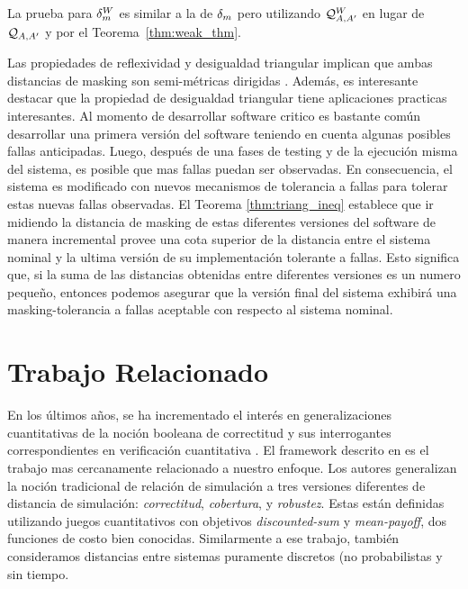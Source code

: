 La prueba para $\delta_{m}^W$ es similar a la de $\delta_{m}$ 
pero utilizando $\mathcal{Q}^W_{A,A'}$ en lugar de $\mathcal{Q}_{A, A'}$ y por el Teorema~\ref{thm:weak_thm}.

Las propiedades de reflexividad y desigualdad triangular implican que ambas distancias de masking son semi-métricas dirigidas \cite{CharikarMM06,AlfaroMRS08}. Además, es interesante destacar que la propiedad de desigualdad triangular tiene aplicaciones practicas interesantes. Al momento de desarrollar software critico es bastante común desarrollar una primera versión del software teniendo en cuenta algunas posibles fallas anticipadas. 
Luego, después de una fases de testing y de la ejecución misma del sistema, es posible que mas fallas puedan ser observadas. En consecuencia, el sistema es modificado con nuevos mecanismos de tolerancia a fallas para tolerar estas nuevas fallas observadas. 
El Teorema \ref{thm:triang_ineq} establece que ir midiendo la distancia de masking de estas diferentes versiones del software de manera incremental provee una cota superior de la distancia entre el sistema nominal y la ultima versión de su implementación tolerante a fallas. Esto significa que, si la suma de las distancias obtenidas entre diferentes versiones es un numero pequeño, entonces podemos asegurar que la versión final del sistema exhibirá una masking-tolerancia a fallas aceptable con respecto al sistema nominal.





\section{Trabajo Relacionado} \label{sec:related_work}

En los últimos años, se ha incrementado el interés en generalizaciones cuantitativas de la noción booleana de correctitud y sus interrogantes correspondientes en verificación cuantitativa \cite{BokerCHK14,CernyHR12,Henzinger10,Henzinger13}.
El framework descrito en \cite{CernyHR12} es el trabajo mas cercanamente relacionado a nuestro enfoque. 
Los autores generalizan la noción tradicional de relación de simulación a tres versiones diferentes de distancia de simulación: \emph{correctitud}, \emph{cobertura}, y \emph{robustez}.
Estas están definidas utilizando juegos cuantitativos con objetivos \emph{discounted-sum} 
y \emph{mean-payoff}, dos funciones de costo bien conocidas.
Similarmente a ese trabajo, también consideramos distancias entre sistemas puramente discretos (no probabilistas y sin tiempo.

